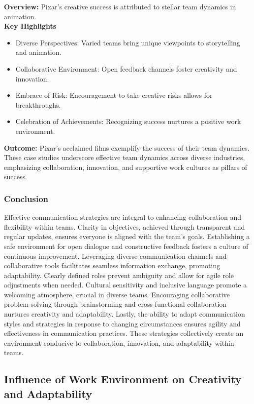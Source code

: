 \documentclass[a4paper, twoside]{article}
\begin{document}
\textbf{Overview:} Pixar's creative success is attributed to stellar team dynamics in animation.\\

\textbf{Key Highlights}
\begin{itemize}
    \item Diverse Perspectives: Varied teams bring unique viewpoints to storytelling and animation.
    \item Collaborative Environment: Open feedback channels foster creativity and innovation.
    \item Embrace of Risk: Encouragement to take creative risks allows for breakthroughs.
    \item Celebration of Achievements: Recognizing success nurtures a positive work environment.
\end{itemize}

\textbf{Outcome:} Pixar's acclaimed films exemplify the success of their team dynamics. These case studies underscore effective team dynamics across diverse industries, emphasizing collaboration, innovation, and supportive work cultures as pillars of success.


\subsubsection{Conclusion}
Effective communication strategies are integral to enhancing collaboration and flexibility within teams. Clarity in objectives, achieved through transparent and regular updates, ensures everyone is aligned with the team's goals. Establishing a safe environment for open dialogue and constructive feedback fosters a culture of continuous improvement. Leveraging diverse communication channels and collaborative tools facilitates seamless information exchange, promoting adaptability. Clearly defined roles prevent ambiguity and allow for agile role adjustments when needed. Cultural sensitivity and inclusive language promote a welcoming atmosphere, crucial in diverse teams. Encouraging collaborative problem-solving through brainstorming and cross-functional collaboration nurtures creativity and adaptability. Lastly, the ability to adapt communication styles and strategies in response to changing circumstances ensures agility and effectiveness in communication practices. These strategies collectively create an environment conducive to collaboration, innovation, and adaptability within teams.




\subsection{Influence of Work Environment on Creativity and Adaptability}
\end{document}
